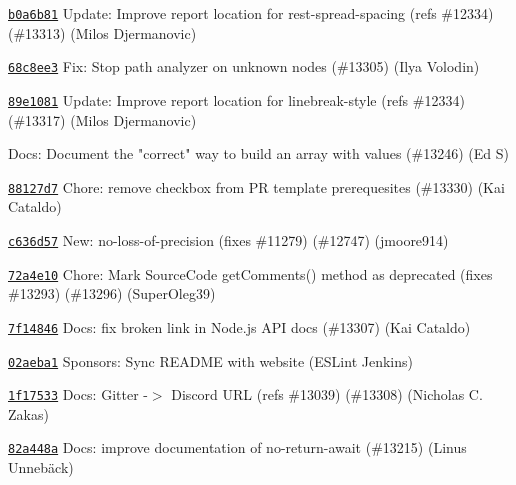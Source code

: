 \begin{DoxyItemize}
\item \href{https://github.com/eslint/eslint/commit/b0a6b8134e3b399beeb69432a02232a1037f7c46}{\texttt{ {\ttfamily b0a6b81}}} Update\+: Improve report location for rest-\/spread-\/spacing (refs \#12334) (\#13313) (Milos Djermanovic)
\item \href{https://github.com/eslint/eslint/commit/68c8ee3ab70187972aef4c4e866bcf29da70a207}{\texttt{ {\ttfamily 68c8ee3}}} Fix\+: Stop path analyzer on unknown nodes (\#13305) (Ilya Volodin)
\item \href{https://github.com/eslint/eslint/commit/89e10811c4df666216aae58bff5f855cd9df738b}{\texttt{ {\ttfamily 89e1081}}} Update\+: Improve report location for linebreak-\/style (refs \#12334) (\#13317) (Milos Djermanovic)
\item \href{https://github.com/eslint/eslint/commit/08913798b4ec420b261b8fbc470504f9f248c840}{\texttt{ {}}} Docs\+: Document the "{}correct"{} way to build an array with values (\#13246) (Ed S)
\item \href{https://github.com/eslint/eslint/commit/88127d74d56b88cc5a0758856995716050021131}{\texttt{ {\ttfamily 88127d7}}} Chore\+: remove checkbox from PR template prerequesites (\#13330) (Kai Cataldo)
\item \href{https://github.com/eslint/eslint/commit/c636d5708c461a8ff1ea55e5df56d4f76f9c4044}{\texttt{ {\ttfamily c636d57}}} New\+: no-\/loss-\/of-\/precision (fixes \#11279) (\#12747) (jmoore914)
\item \href{https://github.com/eslint/eslint/commit/72a4e1044592057c4a3f39dbb1dbe61b00ea8af6}{\texttt{ {\ttfamily 72a4e10}}} Chore\+: Mark Source\+Code get\+Comments() method as deprecated (fixes \#13293) (\#13296) (Super\+Oleg39)
\item \href{https://github.com/eslint/eslint/commit/7f1484690665b4f4b9cd9680ca8bb7b5cf56e48a}{\texttt{ {\ttfamily 7f14846}}} Docs\+: fix broken link in Node.\+js API docs (\#13307) (Kai Cataldo)
\item \href{https://github.com/eslint/eslint/commit/02aeba19afb301140514097235a9f2a00a9acb2a}{\texttt{ {\ttfamily 02aeba1}}} Sponsors\+: Sync README with website (ESLint Jenkins)
\item \href{https://github.com/eslint/eslint/commit/1f175338cba29960aab67a540f516051f9d428c8}{\texttt{ {\ttfamily 1f17533}}} Docs\+: Gitter -\/\texorpdfstring{$>$}{>} Discord URL (refs \#13039) (\#13308) (Nicholas C. Zakas)
\item \href{https://github.com/eslint/eslint/commit/82a448a7deff24e9207f60dfe77622c00102bd99}{\texttt{ {\ttfamily 82a448a}}} Docs\+: improve documentation of no-\/return-\/await (\#13215) (Linus Unnebäck)

\end{DoxyItemize}
